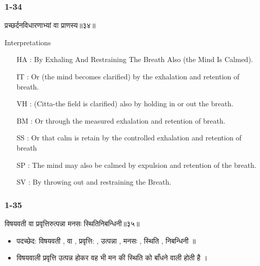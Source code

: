 \begin{frame}[fragile]\frametitle{1-34}
\begin{sanskrit}
प्रच्छर्दनविधारणाभ्यां वा प्राणस्य॥३४॥
\end{sanskrit}

Interpretations
\begin{itemize}	
\item [HA]: By Exhaling And Restraining The Breath Also (the Mind Is Calmed).
\item [IT]: Or (the mind becomes clarified) by the exhalation and retention of breath.
\item [VH]: (Citta-the field is clarified) also by holding in or out the breath.
\item [BM]: Or through the measured exhalation and retention of breath.
\item [SS]: Or that calm is retain by the controlled exhalation and retention of breath
\item [SP]: The mind may also be calmed by expulsion and retention of the breath.
\item [SV]: By throwing out and restraining the Breath. 
\end{itemize}
	
\end{frame}

\begin{frame}[fragile]\frametitle{ 1-35}
\begin{sanskrit}
विषयवती वा प्रवृत्तिरुत्पन्ना मनसः स्थितिनिबन्धिनी॥३५॥
\end{sanskrit}

\begin{itemize}
\item पदच्छेद: विषयवती , वा , प्रवृत्ति: , उत्पन्ना , मनसः , स्थिति , निबन्धिनी ॥
\item विषयवाली प्रवृत्ति उत्पन्न होकर वह भी मन की स्थिति को बाँधने वाली होती है ।
\end{itemize}
	
\end{frame}

